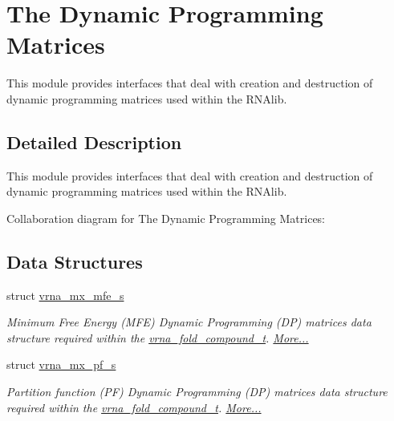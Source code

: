 \hypertarget{group__dp__matrices}{}\section{The Dynamic Programming Matrices}
\label{group__dp__matrices}


This module provides interfaces that deal with creation and destruction of dynamic programming matrices used within the R\+N\+Alib.  




\subsection{Detailed Description}
This module provides interfaces that deal with creation and destruction of dynamic programming matrices used within the R\+N\+Alib. 

Collaboration diagram for The Dynamic Programming Matrices\+:
\subsection*{Data Structures}
\begin{DoxyCompactItemize}
\item 
struct \mbox{\hyperlink{group__dp__matrices_structvrna__mx__mfe__s}{vrna\+\_\+mx\+\_\+mfe\+\_\+s}}
\begin{DoxyCompactList}\small\item\em Minimum Free Energy (M\+FE) Dynamic Programming (DP) matrices data structure required within the \mbox{\hyperlink{group__fold__compound_ga1b0cef17fd40466cef5968eaeeff6166}{vrna\+\_\+fold\+\_\+compound\+\_\+t}}.  \mbox{\hyperlink{group__dp__matrices_structvrna__mx__mfe__s}{More...}}\end{DoxyCompactList}\item 
struct \mbox{\hyperlink{group__dp__matrices_structvrna__mx__pf__s}{vrna\+\_\+mx\+\_\+pf\+\_\+s}}
\begin{DoxyCompactList}\small\item\em Partition function (PF) Dynamic Programming (DP) matrices data structure required within the \mbox{\hyperlink{group__fold__compound_ga1b0cef17fd40466cef5968eaeeff6166}{vrna\+\_\+fold\+\_\+compound\+\_\+t}}.  \mbox{\hyperlink{group__dp__matrices_structvrna__mx__pf__s}{More...}}\end{DoxyCompactList}\end{DoxyCompactItemize}
